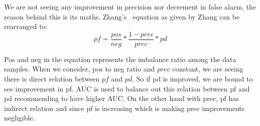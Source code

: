 \documentclass[10pt,conference]{IEEEtran}
\newcommand{\bi}{\begin{itemize}[leftmargin=0.4cm]}
\newcommand{\ei}{\end{itemize}}
\theoremstyle{break}
\theoremstyle{break}
\begin{document}
We are not seeing any improvement in precision nor decrement in false alarm, the reason behind this is its maths. Zhang's~\cite{menzies2007problems} equation as given by Zhang can be rearranged to:
\[
  \mathit{pf}=  \frac{pos}{neg} *\frac{1-\mathit{prec}}{\mathit{prec}}* \mathit{pd}\]

Pos and neg in the equation represents the imbalance ratio among the data samples. When we consider, pos to neg ratio and $prec$ constant, we are seeing there is direct relation between $pf$ and $pd$. So if pd is improved, we are bound to see improvement in pf. AUC is used to balance out this relation between pf and pd recommending to have higher AUC. On the other hand with prec, pf has indirect relation and since pf is increasing which is making prec improvements negligible.







\end{document}
